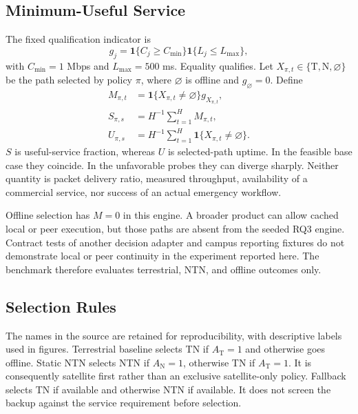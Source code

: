 \documentclass[10pt,twocolumn]{article}
\newcommand{\ind}{\mathbf{1}}
\newcommand{\TN}{\mathrm{T}}
\newcommand{\NTN}{\mathrm{N}}
\begin{document}
\subsection{Minimum-Useful Service}
The fixed qualification indicator is
\begin{equation}\label{eq:qualification}
 g_j=\ind\{C_j\ge C_{\min}\}\ind\{L_j\le L_{\max}\},
\end{equation}
with $C_{\min}=1$ Mbps and $L_{\max}=500$ ms. Equality qualifies. Let $X_{\pi,t}\in\{\TN,\NTN,\varnothing\}$ be the path selected by policy $\pi$, where $\varnothing$ is offline and $g_{\varnothing}=0$. Define
\begin{align}
 M_{\pi,t}&=\ind\{X_{\pi,t}\ne\varnothing\}g_{X_{\pi,t}},\\
 S_{\pi,s}&=H^{-1}\sum_{t=1}^{H}M_{\pi,t},\label{eq:service}\\
 U_{\pi,s}&=H^{-1}\sum_{t=1}^{H}\ind\{X_{\pi,t}\ne\varnothing\}.
\end{align}
$S$ is useful-service fraction, whereas $U$ is selected-path uptime. In the feasible base case they coincide. In the unfavorable probes they can diverge sharply. Neither quantity is packet delivery ratio, measured throughput, availability of a commercial service, nor success of an actual emergency workflow.

Offline selection has $M=0$ in this engine. A broader product can allow cached local or peer execution, but those paths are absent from the seeded RQ3 engine. Contract tests of another decision adapter and campus reporting fixtures do not demonstrate local or peer continuity in the experiment reported here. The benchmark therefore evaluates terrestrial, NTN, and offline outcomes only.

\subsection{Selection Rules}
The names in the source are retained for reproducibility, with descriptive labels used in figures. Terrestrial baseline selects TN if $A_\TN=1$ and otherwise goes offline. Static NTN selects NTN if $A_\NTN=1$, otherwise TN if $A_\TN=1$. It is consequently satellite first rather than an exclusive satellite-only policy. Fallback selects TN if available and otherwise NTN if available. It does not screen the backup against the service requirement before selection.
\end{document}
